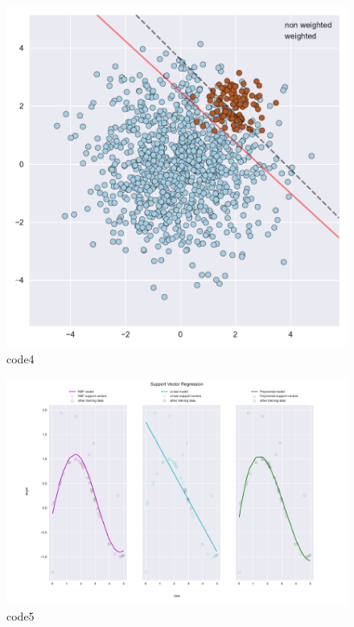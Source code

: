 \begin{PythonCode}\label{例4}
	
\end{PythonCode}

\begin{figure}[htbp]
	\centering
	\includegraphics[width=14cm]{codeimage/code4}
	\caption{code4}
	\label{code4}
\end{figure}

\begin{PythonCode}\label{例5}
	
\end{PythonCode}

\begin{figure}[htbp]
	\centering
	\includegraphics[width=14cm]{codeimage/code5}
	\caption{code5}
	\label{code5}
\end{figure}
